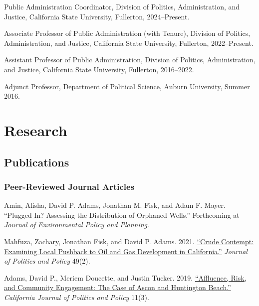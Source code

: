 \documentclass[12pt,letterpaper]{article}
\renewenvironment{itemize}{
  \begin{list}{}{
    \setlength{\leftmargin}{1.5em}
    \setlength{\itemsep}{0.25em}
    \setlength{\parskip}{0pt}
    \setlength{\parsep}{0.25em}
  }
}{
  \end{list}
}
\begin{document}
  \begin{itemize}\leftmargin=2pt\itemindent=-15pt\leftmargin=2pt\itemindent=-15pt
      \item Public Administration Coordinator, Division of Politics, Administration, and Justice, California State University, Fullerton, 2024--Present. \vspace{0.2cm}
      \item Associate Professor of Public Administration (with Tenure), Division of Politics, Administration, and Justice, California State University, Fullerton, 2022--Present. \vspace{0.2cm}
      \item Assistant Professor of Public Administration, Division of Politics, Administration, and Justice, California State University, Fullerton,  2016--2022.\vspace{0.2cm}
      \item Adjunct Professor, Department of Political Science, Auburn University, Summer 2016.
  \end{itemize}

\section*{Research}

\subsection*{Publications}

\subsubsection*{Peer-Reviewed Journal Articles}

\begin{itemize}\leftmargin=2pt\itemindent=-15pt\leftmargin=2pt\itemindent=-15pt

  \item Amin, Alisha, David P. Adams, Jonathan M. Fisk, and Adam F. Mayer. ``Plugged In? Assessing the Distribution of Orphaned Wells.'' Forthcoming at \emph{Journal of Environmental Policy and Planning}.

  \item Mahfuza, Zachary, Jonathan Fisk, and David P. Adams. 2021. \href{https://doi.org/10.1111/polp.12401}{``Crude Contempt: Examining Local Pushback to Oil and Gas Development in California.''} \emph{Journal of Politics and Policy} 49(2).

  \item Adams, David P., Meriem Doucette, and Justin Tucker. 2019. \href{https://escholarship.org/uc/item/2mz2n6qk}{``Affluence, Risk, and Community Engagement: The Case of Ascon and Huntington Beach.''} \emph{California Journal of Politics and Policy} 11(3).   

\end{itemize}
\end{document}
